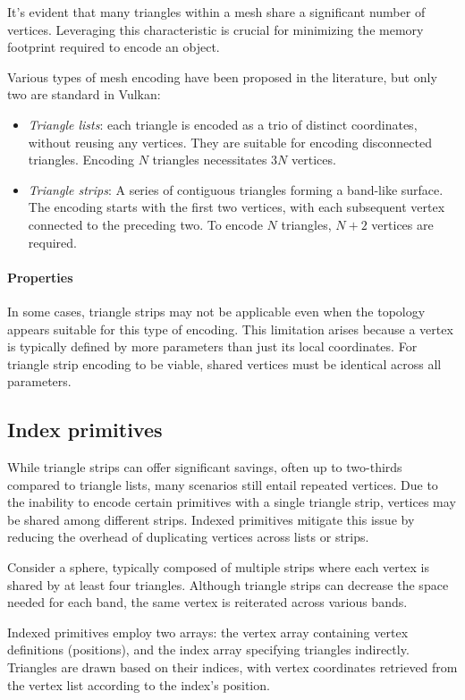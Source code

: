 It's evident that many triangles within a mesh share a significant number of vertices. 
Leveraging this characteristic is crucial for minimizing the memory footprint required to encode an object.

Various types of mesh encoding have been proposed in the literature, but only two are standard in Vulkan: 
\begin{itemize}
    \item \textit{Triangle lists}: each triangle is encoded as a trio of distinct coordinates, without reusing any vertices. 
        They are suitable for encoding disconnected triangles. 
        Encoding $N$ triangles necessitates $3N$ vertices.
    \item \textit{Triangle strips}: A series of contiguous triangles forming a band-like surface. 
        The encoding starts with the first two vertices, with each subsequent vertex connected to the preceding two. 
        To encode $N$ triangles, $N+2$ vertices are required.
\end{itemize}

\paragraph*{Properties}
In some cases, triangle strips may not be applicable even when the topology appears suitable for this type of encoding. 
This limitation arises because a vertex is typically defined by more parameters than just its local coordinates. 
For triangle strip encoding to be viable, shared vertices must be identical across all parameters.

\subsection{Index primitives}
While triangle strips can offer significant savings, often up to two-thirds compared to triangle lists, many scenarios still entail repeated vertices. 
Due to the inability to encode certain primitives with a single triangle strip, vertices may be shared among different strips. 
Indexed primitives mitigate this issue by reducing the overhead of duplicating vertices across lists or strips.

Consider a sphere, typically composed of multiple strips where each vertex is shared by at least four triangles. 
Although triangle strips can decrease the space needed for each band, the same vertex is reiterated across various bands.

Indexed primitives employ two arrays: the vertex array containing vertex definitions (positions), and the index array specifying triangles indirectly. 
Triangles are drawn based on their indices, with vertex coordinates retrieved from the vertex list according to the index's position.

